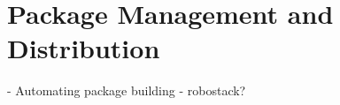 \chapter{Package Management and Distribution}\label{cha:packages}

- Automating package building
- robostack?